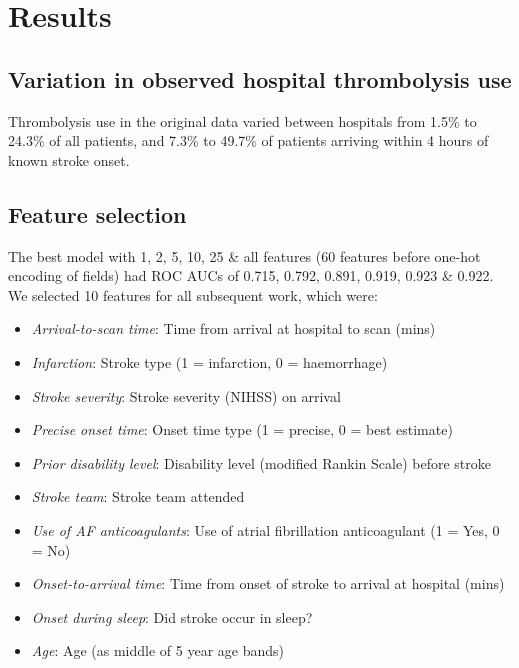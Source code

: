 \section{Results}

\subsection{Variation in observed hospital thrombolysis use}

Thrombolysis use in the original data varied between hospitals from 1.5\% to 24.3\% of all patients, and 7.3\% to 49.7\% of patients arriving within 4 hours of known stroke onset.


\subsection{Feature selection}

The best model with 1, 2, 5, 10, 25 \& all features (60 features before one-hot encoding of fields) had ROC AUCs of 0.715, 0.792, 0.891, 0.919, 0.923 \& 0.922. We selected 10 features for all subsequent work, which were:

\begin{itemize}
    \item \emph{Arrival-to-scan time}: Time from arrival at hospital to scan (mins)
    \item \emph{Infarction}: Stroke type (1 = infarction, 0 = haemorrhage)
    \item \emph{Stroke severity}: Stroke severity (NIHSS) on arrival
    \item \emph{Precise onset time}: Onset time type (1 = precise, 0 = best estimate)
    \item \emph{Prior disability level}: Disability level (modified Rankin Scale) before stroke
    \item \emph{Stroke team}: Stroke team attended
    \item \emph{Use of AF anticoagulants}: Use of atrial fibrillation anticoagulant (1 = Yes, 0 = No)
    \item \emph{Onset-to-arrival time}: Time from onset of stroke to arrival at hospital (mins)
    \item \emph{Onset during sleep}: Did stroke occur in sleep?
    \item \emph{Age}: Age (as middle of 5 year age bands)
\end{itemize}

